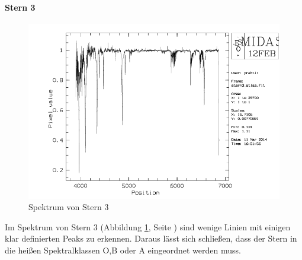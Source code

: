 \paragraph{Stern 3}
\begin{figure}
\includegraphics[height=.4\textheight]{images/stern3_spektrum.png}
\caption{Spektrum von Stern 3}
\label{fig:stern3_spektrum}
\end{figure}
Im Spektrum von Stern 3 (Abbildung \ref{fig:stern3_spektrum}, Seite \pageref{fig:stern3_spektrum}) sind wenige Linien mit einigen klar definierten Peaks zu erkennen. Daraus lässt sich schließen, dass der Stern in die heißen Spektralklassen O,B oder A  eingeordnet werden muss.

